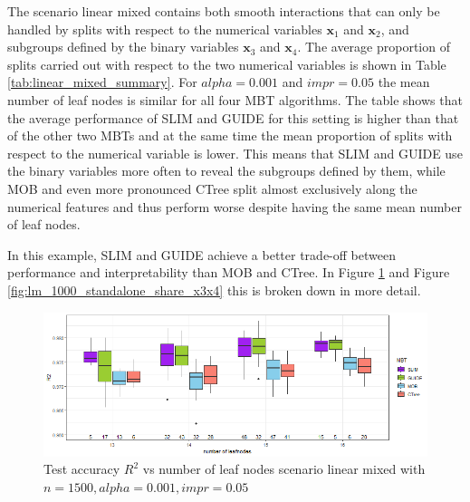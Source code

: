 The scenario linear mixed contains both smooth interactions that can only be handled by splits with respect to the numerical variables $\textbf{x}_1$ and $\textbf{x}_2$, and subgroups defined by the binary variables $\textbf{x}_3$ and $\textbf{x}_4$. 
The average proportion of splits carried out with respect to the two numerical variables is shown in Table \ref{tab:linear_mixed_summary}.
For $alpha = 0.001$ and $impr = 0.05$ the mean number of leaf nodes is similar for all four MBT algorithms. The table shows that the average performance of SLIM and GUIDE for this setting is higher than that of the other two MBTs and at the same time the mean proportion of splits with respect to the numerical variable is lower.  This means that SLIM and GUIDE use the binary variables more often to reveal the subgroups defined by them, while MOB and even more pronounced CTree split almost exclusively along the numerical features and thus perform worse despite having the same mean number of leaf nodes. 

In this example, SLIM and GUIDE achieve a better trade-off between performance and interpretability than MOB and CTree.
In Figure \ref{fig:lm_1000_standalone_r2_test} and Figure \ref{fig:lm_1000_standalone_share_x3x4} this is broken down in more detail.


\begin{figure}[!htb]
\centering
    \includegraphics[width=14cm]{Figures/simulations/chapter_5_simulation_study/basic_scenarios/linear_mixed/lm_1000_standalone_r2_test.png}
    \caption{Test accuracy $R^2$ vs number of leaf nodes scenario linear mixed with $n=1500, alpha = 0.001, impr = 0.05$}
    \label{fig:lm_1000_standalone_r2_test}

\end{figure} 


